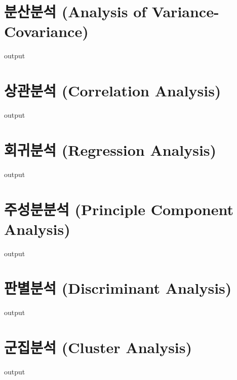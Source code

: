 \section{분산분석 (Analysis of Variance-Covariance)}
\begin{Schunk}
\begin{Soutput}
output
\end{Soutput}
\end{Schunk}

\section{상관분석 (Correlation Analysis) }
\begin{Schunk}
\begin{Soutput}
output
\end{Soutput}
\end{Schunk}

\section{회귀분석 (Regression Analysis) }
\begin{Schunk}
\begin{Soutput}
output
\end{Soutput}
\end{Schunk}

\section{주성분분석 (Principle Component Analysis)}
\begin{Schunk}
\begin{Soutput}
output
\end{Soutput}
\end{Schunk}

\section{판별분석 (Discriminant Analysis) }
\begin{Schunk}
\begin{Soutput}
output
\end{Soutput}
\end{Schunk}

\section{군집분석 (Cluster Analysis) }
\begin{Schunk}
\begin{Soutput}
output
\end{Soutput}
\end{Schunk}

